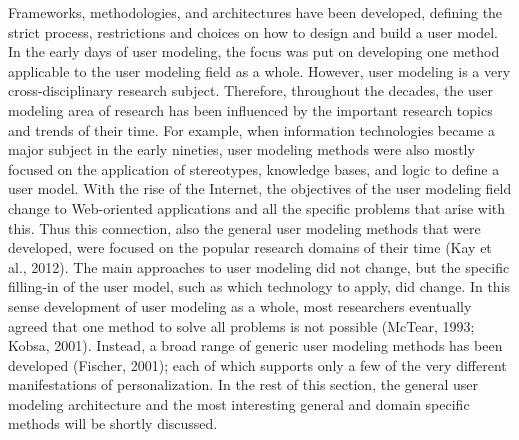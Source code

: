 Frameworks,  methodologies, and architectures have been developed, defining the
strict process, restrictions and choices on how to design and build a user
model.  In the early days of user modeling, the focus was put on developing one
method applicable to the user modeling field as a whole. However, user modeling
is a very cross‐disciplinary research subject. Therefore, throughout the
decades, the user modeling area of research has been influenced by the important
research topics and trends of their time. For example, when information
technologies became a major subject in the early nineties, user modeling methods
were also mostly focused on the application of stereotypes, knowledge bases, and
logic to define a user model. With the rise of the Internet, the objectives of
the user modeling field change to Web-oriented applications and all the specific
problems that arise with this. Thus this connection,  also the general user
modeling methods that were developed, were focused on the popular research
domains of their time (Kay et al., 2012). The main approaches to user modeling
did not change, but the specific filling‐in of the user model, such as which
technology to apply, did change. In this sense development of user modeling as a
whole, most researchers eventually agreed that one method to solve all problems
is not possible (McTear, 1993; Kobsa, 2001). Instead, a broad range of  generic
user modeling methods has been developed (Fischer, 2001); each of which supports
only a few of the very different manifestations of personalization. In the rest
of this section, the general user modeling architecture and the most interesting
general and domain specific methods will be shortly discussed.







